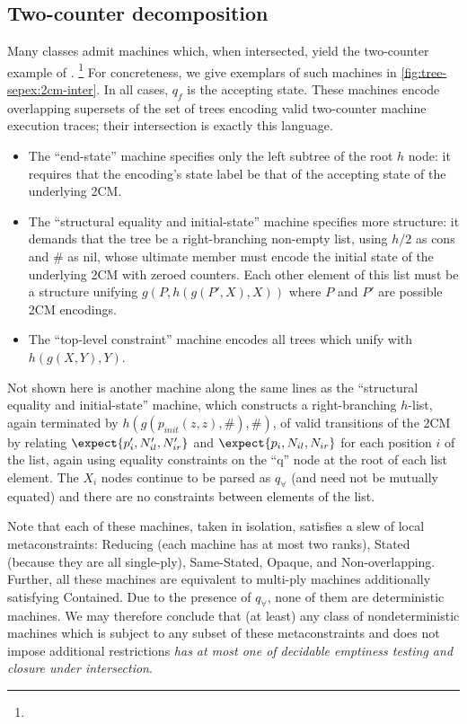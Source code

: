 \subsection{Two-counter decomposition}
\label{sec:tree-sepex:twocm}

Many classes admit machines which, when intersected, yield the two-counter
example of \cite{tata}.%
%
\footnote{}
%
For concreteness, we give exemplars of such machines in
\autoref{fig:tree-sepex:2cm-inter}.  In all cases, $q_f$ is the accepting
state.  These machines encode overlapping supersets of the set of trees
encoding valid two-counter machine execution traces; their intersection is
exactly this language.
%
\begin{itemize}
%
  \item The ``end-state'' machine specifies only the left subtree of the
root $h$ node: it requires that the encoding's state label be that of the
accepting state of the underlying 2CM.
%
  \item The ``structural equality and initial-state'' machine specifies more
structure: it demands that the tree be a right-branching non-empty list,
using $h/2$ as cons and $\#$ as nil, whose ultimate member must encode the
initial state of the underlying 2CM with zeroed counters.  Each other
element of this list must be a structure unifying $g(P,h(g(P',X),X))$ where
$P$ and $P'$ are possible 2CM encodings.
%
  \item The ``top-level constraint'' machine encodes all trees which unify
with $h(g(X,Y),Y)$.
%
\end{itemize}
%
Not shown here is another machine along the same lines as the ``structural
equality and initial-state'' machine, which constructs a right-branching
$h$-list, again terminated by $h(g(p_{init}(z,z),\#),\#)$, of valid
transitions of the 2CM by relating $\expect{p'_i,N_{il}',N_{ir}'}$ and
$\expect{p_i,N_{il},N_{ir}}$ for each position $i$ of the list, again using
equality constraints on the ``q'' node at the root of each list element.
The $X_i$ nodes continue to be parsed as $q_\forall$ (and need not be
mutually equated) and there are no constraints between elements of the list.

Note that each of these machines, taken in isolation, satisfies a slew of
local metaconstraints: Reducing (each machine has at most two ranks), Stated
(because they are all single-ply), Same-Stated, Opaque, and Non-overlapping.
Further, all these machines are equivalent to multi-ply machines
additionally satisfying Contained.  Due to the presence of $q_\forall$, none
of them are deterministic machines.  We may therefore conclude that (at
least) any class of nondeterministic machines which is subject to any subset
of these metaconstraints and does not impose additional restrictions {\em
has at most one of decidable emptiness testing and closure under
intersection}.

